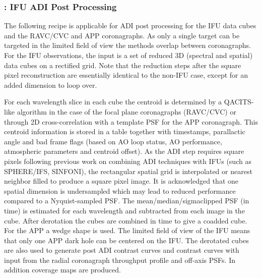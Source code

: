 \subsubsection{: IFU ADI Post Processing}
\label{sssec:adi_ifu}


The following recipe is applicable for ADI post processing for the IFU
data cubes and the RAVC/CVC and APP coronagraphs. As only a single
target can be targeted in the limited field of view the methods
overlap between coronagraphs.  For the IFU observations, the input is
a set of reduced 3D (spectral and spatial) data cubes on a rectified
grid. Note that the reduction steps after the square pixel reconstruction
are essentially identical to the non-IFU case, except for an added dimension
to loop over. 

For each wavelength slice in each cube the centroid is determined by a
QACITS-like algorithm in the case of the focal plane coronagraphs
(RAVC/CVC) or through 2D cross-correlation with a template PSF for the
APP coronagraph. This centroid information is stored in a table
together with timestamps, parallactic angle and bad frame flags (based
on AO loop status, AO performance, atmospheric parameters and centroid
offset).  As the ADI step requires square pixels following previous
work on combining ADI techniques with IFUs (such as SPHERE/IFS,
SINFONI), the rectangular spatial grid is interpolated or nearest
neighbor filled to produce a square pixel image.  It is acknowledged
that one spatial dimension is undersampled which may lead to reduced
performance compared to a Nyquist-sampled PSF.  The
mean/median/sigmaclipped PSF (in time) is estimated for each
wavelength and subtracted from each image in the cube.  After
derotation the cubes are combined in time to give a coadded cube. For
the APP a wedge shape is used. The limited field of view of the IFU
means that only one APP dark hole can be centered on the IFU. The derotated cubes
are also used to generate post ADI contrast curves and contrast curves
with input from the radial coronagraph throughput profile and off-axis
PSFs. In addition coverage maps are produced.




